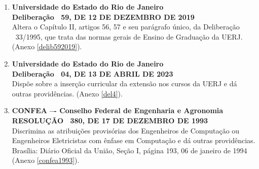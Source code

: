 \begin{enumerate}
      \item \textbf{Universidade do Estado do Rio de Janeiro}  \\
            \textbf{Deliberação ~59, DE 12 DE DEZEMBRO DE 2019} \cite{uerj2019} \\
            Altera o Capítulo II, artigos 56, 57 e seu parágrafo único, da Deliberação ~33/1995, que trata das normas gerais de Ensino de Graduação da UERJ. (Anexo \ref{delib592019}).
      \item \textbf{Universidade do Estado do Rio de Janeiro}  \\
            \textbf{Deliberação ~04, DE 13 DE ABRIL DE 2023} \cite{uerj2023} \\
            Dispõe sobre a inserção curricular da extensão nos cursos da UERJ e dá outras providências. (Anexo \ref{del4}).
      \item \textbf{CONFEA –- Conselho Federal de Engenharia e Agronomia} \\
            \textbf{RESOLUÇÃO ~380, DE 17 DE DEZEMBRO DE 1993} \cite{confea1993} \\
            Discrimina as atribuições provisórias dos Engenheiros de Computação ou Engenheiros Eletricistas com ênfase em Computação e dá outras providências. Brasília: Diário Oficial da União, Seção I, página 193, 06 de janeiro de 1994 (Anexo \ref{confea1993}).
\end{enumerate}
